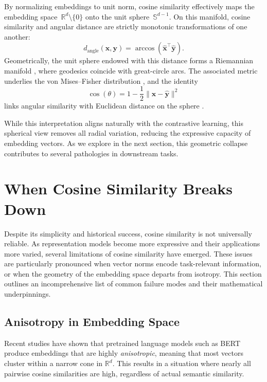 \documentclass[11pt]{article}
\newcommand{\bfx}{\boldsymbol{x}}
\newcommand{\bfy}{\boldsymbol{y}}
\begin{document}
By normalizing embeddings to unit norm, cosine similarity effectively maps the embedding space $\mathbb{R}^d \setminus \{0\}$ onto the unit sphere $\mathbb{S}^{d-1}$. On this manifold, cosine similarity and angular distance are strictly monotonic transformations of one another:
\begin{equation*}
	d_{\text{angle}}(\mathbf{x}, \mathbf{y}) = \arccos(\hat{\mathbf{x}}^\top \hat{\mathbf{y}}).
\end{equation*}
Geometrically, the unit sphere endowed with this distance forms a Riemannian manifold \citep{lee_1997_RiemannianManifoldsIntroduction}, where geodesics coincide with great-circle arcs. The associated metric underlies the von Mises–Fisher distribution \citep{fisher_1953_DispersionSphere}, and the identity
\begin{equation*}
	\cos(\theta) = 1 - \frac{1}{2}\|\hat{\bfx} - \hat{\bfy}\|^2
\end{equation*}
links angular similarity with Euclidean distance on the sphere \citep{you_2022_ParameterEstimationModelbased}.

While this interpretation aligns naturally with the contrastive learning, this spherical view removes all radial variation, reducing the expressive capacity of embedding vectors. As we explore in the next section, this geometric collapse contributes to several pathologies in downstream tasks.


\section{When Cosine Similarity Breaks Down}\label{sec:failures}

Despite its simplicity and historical success, cosine similarity is not universally reliable. As representation models become more expressive and their applications more varied, several limitations of cosine similarity have emerged. These issues are particularly pronounced when vector norms encode task-relevant information, or when the geometry of the embedding space departs from isotropy. This section outlines an incomprehensive list of common failure modes and their mathematical underpinnings.

\subsection{Anisotropy in Embedding Space}

Recent studies have shown that pretrained language models such as BERT produce embeddings that are highly \textit{anisotropic}, meaning that most vectors cluster within a narrow cone in $\mathbb{R}^d$. This results in a situation where nearly all pairwise cosine similarities are high, regardless of actual semantic similarity.
\end{document}
